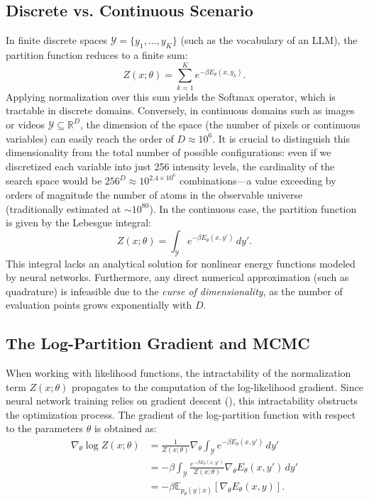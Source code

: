 \documentclass[11pt, oneside, openany]{book}
\begin{document}
\subsection{Discrete vs. Continuous Scenario}
\label{sec:2.4.1}

In finite discrete spaces $\mathcal{Y} = \{y_{1}, \dots, y_{K}\}$ (such as the vocabulary of an LLM), the partition function reduces to a finite sum:
\begin{equation}
\label{eq:2.11}
Z(x;\theta) = \sum_{k=1}^{K} e^{-\beta E_{\theta}(x,y_{k})}.
\end{equation}
Applying normalization over this sum yields the Softmax operator, which is tractable in discrete domains. Conversely, in continuous domains such as images or videos $\mathcal{Y} \subseteq \mathbb{R}^{D}$, the dimension of the space (the number of pixels or continuous variables) can easily reach the order of $D \approx 10^{6}$. It is crucial to distinguish this dimensionality from the total number of possible configurations: even if we discretized each variable into just 256 intensity levels, the cardinality of the search space would be $256^{D} \approx 10^{2.4 \times 10^{6}}$ combinations---a value exceeding by orders of magnitude the number of atoms in the observable universe (traditionally estimated at $\sim 10^{80}$). In the continuous case, the partition function is given by the Lebesgue integral:
\begin{equation}
\label{eq:2.12}
Z(x;\theta) = \int_{\mathcal{Y}} e^{-\beta E_{\theta}(x,y')}\,dy'.
\end{equation}
This integral lacks an analytical solution for nonlinear energy functions modeled by neural networks. Furthermore, any direct numerical approximation (such as quadrature) is infeasible due to the \textit{curse of dimensionality}, as the number of evaluation points grows exponentially with $D$.

\subsection{The Log-Partition Gradient and MCMC}
\label{sec:2.4.2}

When working with likelihood functions, the intractability of the normalization term $Z(x;\theta)$ propagates to the computation of the log-likelihood gradient. Since neural network training relies on gradient descent (), this intractability obstructs the optimization process. The gradient of the log-partition function with respect to the parameters $\theta$ is obtained as:
\begin{align}
\nabla_{\theta} \log Z(x;\theta) &= \frac{1}{Z(x;\theta)} \nabla_{\theta} \int_{\mathcal{Y}} e^{-\beta E_{\theta}(x,y')}\,dy' \nonumber \\
&= -\beta \int_{\mathcal{Y}} \frac{e^{-\beta E_{\theta}(x,y')}}{Z(x;\theta)} \nabla_{\theta} E_{\theta}(x,y')\,dy' \nonumber \\
&= -\beta \mathbb{E}_{p_{\theta}(y \mid x)}[\nabla_{\theta} E_{\theta}(x,y)]. \label{eq:2.13}
\end{align}
\end{document}
